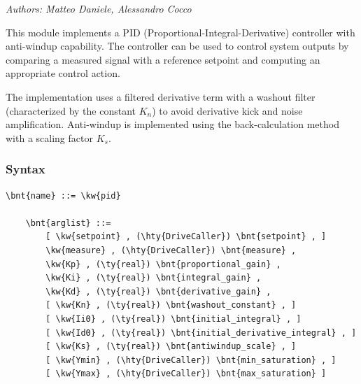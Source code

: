 % 
% 
% 
% 
% 
% 
% 
% 
% 

\emph{Authors: Matteo Daniele, Alessandro Cocco}

\bigskip

This module implements a PID (Proportional-Integral-Derivative) controller with anti-windup capability.
The controller can be used to control system outputs by comparing a measured signal with a reference setpoint and computing an appropriate control action.

The implementation uses a filtered derivative term with a washout filter (characterized by the constant $K_n$) to avoid derivative kick and noise amplification.
Anti-windup is implemented using the back-calculation method with a scaling factor $K_s$.

\subsubsection{Syntax}

\begin{Verbatim}[commandchars=\\\{\}]
    \bnt{name} ::= \kw{pid}

    \bnt{arglist} ::=
        [ \kw{setpoint} , (\hty{DriveCaller}) \bnt{setpoint} , ]
        \kw{measure} , (\hty{DriveCaller}) \bnt{measure} ,
        \kw{Kp} , (\ty{real}) \bnt{proportional_gain} ,
        \kw{Ki} , (\ty{real}) \bnt{integral_gain} ,
        \kw{Kd} , (\ty{real}) \bnt{derivative_gain} ,
        [ \kw{Kn} , (\ty{real}) \bnt{washout_constant} , ]
        [ \kw{Ii0} , (\ty{real}) \bnt{initial_integral} , ]
        [ \kw{Id0} , (\ty{real}) \bnt{initial_derivative_integral} , ]
        [ \kw{Ks} , (\ty{real}) \bnt{antiwindup_scale} , ]
        [ \kw{Ymin} , (\hty{DriveCaller}) \bnt{min_saturation} , ]
        [ \kw{Ymax} , (\hty{DriveCaller}) \bnt{max_saturation} ]
\end{Verbatim}

